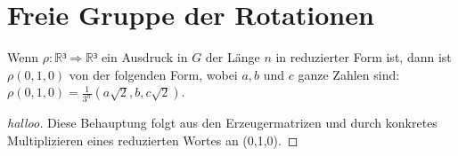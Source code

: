 \chapter{Freie Gruppe der Rotationen}

\begin{lemma}\label{Konkrete_Darstellung_Drehungen}
\leanok
Wenn $\rho : \mathbb{R}³\Rightarrow\mathbb{R}³$ ein Ausdruck in $G$ der Länge 
$n$ in reduzierter Form ist, dann ist $\rho(0,1,0)$ von der folgenden Form, wobei
$a, b$ und $c$ ganze Zahlen sind: $\rho(0,1,0)=\frac{1}{3^n}(a\sqrt{2},b,c\sqrt{2})$.
\end{lemma}

\begin{proof}[halloo]\leanok Diese Behauptung folgt aus den Erzeugermatrizen
     und durch konkretes Multiplizieren eines reduzierten Wortes an (0,1,0).
\end{proof}
